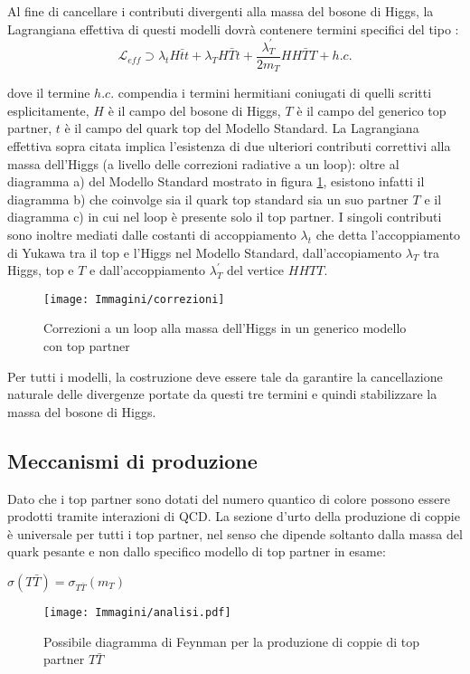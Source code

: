 \medskip
Al fine di cancellare i contributi divergenti alla massa del bosone di Higgs, la Lagrangiana
effettiva di questi modelli dovrà contenere termini specifici del tipo \cite{decay2}:
\begin{equation}
 \mathcal{L}_{eff}\supset \lambda_{t}H\bar{t}t+\lambda_{T}H\bar{T}t+\dfrac{\lambda^{'}_{T}}{2m_{T}}HH\bar{T}T +h.c.
\end{equation}

dove il termine $h.c.$ compendia i termini hermitiani coniugati di quelli scritti esplicitamente, $H$ è il campo del bosone di Higgs, $T$
è il campo del generico top partner, $t$ è il campo del quark top del Modello Standard.
\newline
La Lagrangiana effettiva sopra citata implica l'esistenza di due ulteriori contributi correttivi alla massa dell'Higgs (a livello delle 
correzioni radiative a un loop): oltre al diagramma a) del Modello Standard mostrato in figura \ref{little_corr}, esistono infatti
il diagramma b) che coinvolge sia il quark top standard sia un suo partner $T$ e il diagramma c) in cui nel loop è presente solo il top partner.
\newline
I singoli contributi sono inoltre mediati dalle costanti di accoppiamento $\lambda_{t}$ che detta l'accoppiamento di Yukawa tra il top
e l'Higgs nel Modello Standard, dall'accopiamento $\lambda_{T}$ tra Higgs, top e $T$ e dall'accoppiamento $\lambda^{'}_{T}$ del vertice $HHTT$. 

\begin{figure}[!htbp]
\begin{center}
\texttt{[image: Immagini/correzioni]}
\end{center}
\caption{Correzioni a un loop alla massa dell'Higgs in un generico modello con top partner}
\label{little_corr}
\end{figure}

Per tutti i modelli, la costruzione deve essere tale da garantire la cancellazione naturale delle divergenze portate da questi tre termini
e quindi stabilizzare la massa del bosone di Higgs.


\subsection{Meccanismi di produzione}\label{utile_sez}
Dato che i top partner sono dotati del numero quantico di colore possono essere prodotti tramite interazioni di \ac{QCD}.
\newline
La sezione d'urto della produzione di coppie è universale per tutti i top partner, nel senso che dipende soltanto dalla massa del quark pesante
e non dallo specifico modello di top partner in esame:
\begin{center}
$ \sigma(T\bar{T})=\sigma_{T\bar{T}}(m_{T})$
\end{center}
\begin{figure}[!htbp]
\begin{center}
\texttt{[image: Immagini/analisi.pdf]}
\end{center}
\caption{Possibile diagramma di Feynman per la produzione di coppie di top partner $T\bar{T}$ }
\label{pair_T}
\end{figure}
  

